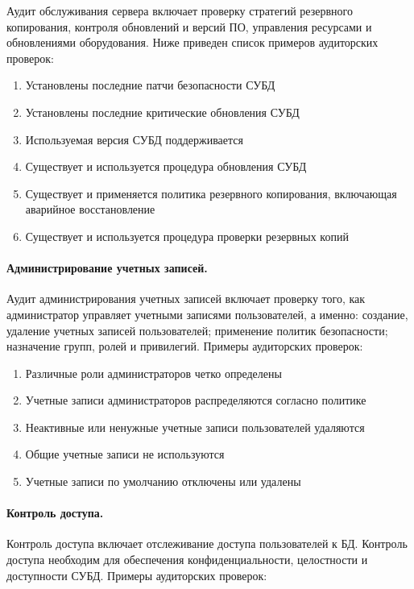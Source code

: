 Аудит обслуживания сервера включает проверку стратегий резервного копирования, контроля обновлений и версий ПО, управления ресурсами и обновлениями оборудования. Ниже приведен список примеров аудиторских проверок:

\begin{enumerate}
	\item Установлены последние патчи безопасности СУБД
	\item Установлены последние критические обновления СУБД
	\item Используемая версия СУБД поддерживается
	\item Существует и используется процедура обновления СУБД
	\item Существует и применяется политика резервного копирования, включающая аварийное восстановление
	\item Существует и используется процедура проверки резервных копий
\end{enumerate}

\paragraph{Администрирование учетных записей.}

Аудит администрирования учетных записей включает проверку того, как администратор управляет учетными записями пользователей, а именно: создание, удаление учетных записей пользователей; применение политик безопасности; назначение групп, ролей и привилегий. Примеры аудиторских проверок:

\begin{enumerate}
	\item Различные роли администраторов четко определены
	\item Учетные записи администраторов распределяются согласно политике
	\item Неактивные или ненужные учетные записи пользователей удаляются
	\item Общие учетные записи не используются
	\item Учетные записи по умолчанию отключены или удалены
\end{enumerate}

\paragraph{Контроль доступа.}

Контроль доступа включает отслеживание доступа пользователей к БД. Контроль доступа необходим для обеспечения конфиденциальности, целостности и доступности СУБД. Примеры аудиторских проверок:

